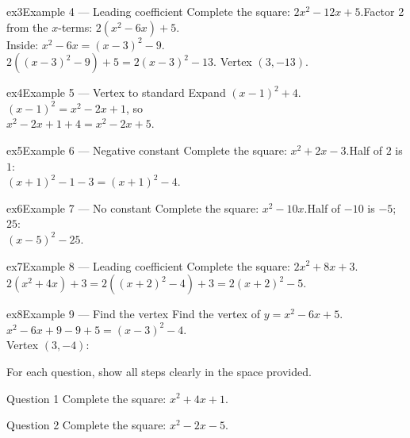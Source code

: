 \documentclass[11pt]{article}
\begin{document}
\begin{example}{ex3}{Example 4 --- Leading coefficient}
Complete the square: $2x^2-12x+5$.\soln Factor 2 from the $x$-terms: $2(x^2-6x)+5$. \\ Inside: $x^2-6x=(x-3)^2-9$. \\ $2((x-3)^2-9)+5=2(x-3)^2-13$. Vertex $(3,-13)$.
\end{example}

\begin{example}{ex4}{Example 5 --- Vertex to standard}
Expand $(x-1)^2+4$.\soln $(x-1)^2=x^2-2x+1$, so \\ $x^2-2x+1+4=x^2-2x+5$.
\end{example}

\begin{example}{ex5}{Example 6 --- Negative constant}
Complete the square: $x^2+2x-3$.\soln Half of $2$ is $1$: \\ $(x+1)^2-1-3=(x+1)^2-4$.
\end{example}

\begin{example}{ex6}{Example 7 --- No constant}
Complete the square: $x^2-10x$.\soln Half of $-10$ is $-5$; $25$: \\ $(x-5)^2-25$.
\end{example}

\begin{example}{ex7}{Example 8 --- Leading coefficient}
Complete the square: $2x^2+8x+3$.\soln $2(x^2+4x)+3=2((x+2)^2-4)+3=2(x+2)^2-5$.
\end{example}

\begin{example}{ex8}{Example 9 --- Find the vertex}
Find the vertex of $y=x^2-6x+5$.\soln $x^2-6x+9-9+5=(x-3)^2-4$. \\ Vertex $(3,-4)$:
\end{example}

\clearpage
{}
For each question, show all steps clearly in the space provided.

\begin{qbox}{Question 1}
Complete the square: $x^2+4x+1$.\workspace{2.4cm}
\end{qbox}

\begin{qbox}{Question 2}
Complete the square: $x^2-2x-5$.\workspace{2.4cm}
\end{qbox}
\end{document}
